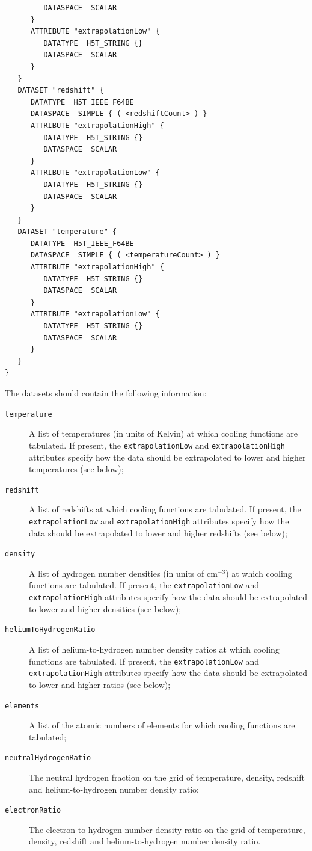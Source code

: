 \begin{description}
\begin{verbatim}
         DATASPACE  SCALAR
      }
      ATTRIBUTE "extrapolationLow" {
         DATATYPE  H5T_STRING {}
         DATASPACE  SCALAR
      }
   }
   DATASET "redshift" {
      DATATYPE  H5T_IEEE_F64BE
      DATASPACE  SIMPLE { ( <redshiftCount> ) }
      ATTRIBUTE "extrapolationHigh" {
         DATATYPE  H5T_STRING {}
         DATASPACE  SCALAR
      }
      ATTRIBUTE "extrapolationLow" {
         DATATYPE  H5T_STRING {}
         DATASPACE  SCALAR
      }
   }
   DATASET "temperature" {
      DATATYPE  H5T_IEEE_F64BE
      DATASPACE  SIMPLE { ( <temperatureCount> ) }
      ATTRIBUTE "extrapolationHigh" {
         DATATYPE  H5T_STRING {}
         DATASPACE  SCALAR
      }
      ATTRIBUTE "extrapolationLow" {
         DATATYPE  H5T_STRING {}
         DATASPACE  SCALAR
      }
   }
}
\end{verbatim}
The datasets should contain the following information:
\begin{description}
\item [{\tt temperature}] A list of temperatures (in units of Kelvin) at which cooling functions are tabulated. If present, the {\tt extrapolationLow} and {\tt extrapolationHigh} attributes specify how the data should be extrapolated to lower and higher temperatures (see below);
\item [{\tt redshift}] A list of redshifts at which cooling functions are tabulated. If present, the {\tt extrapolationLow} and {\tt extrapolationHigh} attributes specify how the data should be extrapolated to lower and higher redshifts (see below);
\item [{\tt density}] A list of hydrogen number densities (in units of cm$^{-3}$) at which cooling functions are tabulated. If present, the {\tt extrapolationLow} and {\tt extrapolationHigh} attributes specify how the data should be extrapolated to lower and higher densities (see below);
\item [{\tt heliumToHydrogenRatio}] A list of helium-to-hydrogen number density ratios at which cooling functions are tabulated. If present, the {\tt extrapolationLow} and {\tt extrapolationHigh} attributes specify how the data should be extrapolated to lower and higher ratios (see below);
\item [{\tt elements}] A list of the atomic numbers of elements for which cooling functions are tabulated;
\item [{\tt neutralHydrogenRatio}] The neutral hydrogen fraction on the grid of temperature, density, redshift and helium-to-hydrogen number density ratio;
\item [{\tt electronRatio}] The electron to hydrogen number density ratio on the grid of temperature, density, redshift and helium-to-hydrogen number density ratio.
\end{description}
\end{description}

